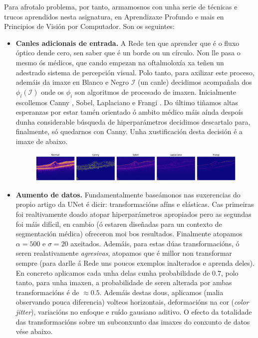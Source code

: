 \documentclass{article}
\begin{document}
Para afrotalo problema, por tanto, armamosnos con unha serie de técnicas e trucos aprendidos nesta asignatura, en Aprendizaxe Profundo e mais en Principios de Visión por Computador. Son os seguintes:
\begin{itemize}
	\item \textbf{Canles adicionais de entrada.} A Rede ten que aprender que é o fluxo óptico dende cero, sen saber que é un borde ou un círculo. Non lle pasa o mesmo ós médicos, que cando empezan na oftalmoloxía xa teñen un adestrado sistema de percepción visual. Polo tanto, para axilizar este proceso, ademáis da imaxe en Blanco e Negro $\mathcal{I}$ (un canle) decidimos acompañala dos $\phi_i(\mathcal{I})$ onde os $\phi_i$ son algoritmos de procesado de imaxen. Inicialmente escollemos Canny \cite{canny1986computational}, Sobel, Laplaciano e Frangi \cite{frangi1998multiscale}. Do último tiñamos altas esperanzas por estar tamén orientado ó ambito médico máis aínda despoís dunha considerable búsqueda de hiperparámetros decidimos descartalo para, finalmente, só quedarnos con Canny. Unha xustificación desta decisión é a imaxe de abaixo. 

\begin{figure}[H]
	\centering
	\includegraphics[width=\linewidth]{figuras/canles.png}
	\label{fig:canles}
\end{figure}


\item \textbf{Aumento de datos.} Fundamentalmente baseámonos nas suxerencias do propio artigo da UNet \cite{ronneberger2015u}  é dicir: transformacións afíns e elásticas. Cas primeiras foi realtivamente doado atopar hiperparámetros apropiados pero as segundas foi máis difícil, en cambio (ó estaren diseñadas para un contexto de segmentación médica) ofreceron moi bos resultados. Finalmente atopamos $\alpha = 500$ e $\sigma = 20$ axeitados. Ademáis, para estas dúas transformacións, ó seren realativamente \emph{agresivas}, atopamos que é millor non transformar sempre (para darlle á Rede uns poucos exemplos inalterados e aprenda deles). En concreto aplicamos cada unha delas cunha probabilidade de 0.7, polo tanto, para unha imaxen, a probabilidade de seren alterada por ambas transformacións é de $\approx 0.5$. Ademáis destas dous, aplicamos (malia observando pouca diferencia) volteos horizontais, deformacións na cor (\emph{color jitter}), variacións no enfoque e ruído gausiano aditivo. O efecto da totalidade das transformacións sobre un subconxunto das imaxes do conxunto de datos vése abaixo.


\end{itemize}
\end{document}
